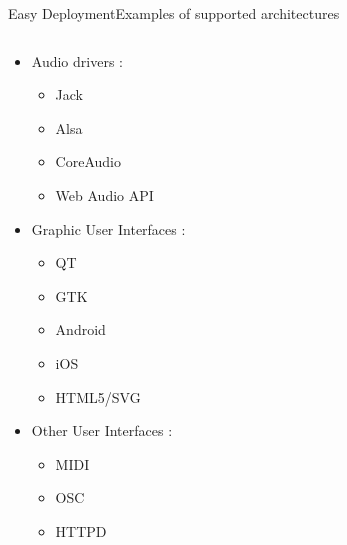 \begin{frame}[shrink=10]{Easy Deployment}{Examples of supported architectures}
\begin{columns}[t]
    \begin{column}{0.45\textwidth}
            \begin{itemize}
                \item Audio drivers :
                \begin{itemize}
                    \item Jack
                    \item Alsa
                    \item CoreAudio
                    \item Web Audio API
                \end{itemize}
                \item Graphic User Interfaces :
                \begin{itemize}
                    \item QT
                    \item GTK
                    \item Android
                    \item iOS
                    \item HTML5/SVG
                \end{itemize}
                \item Other User Interfaces :
                \begin{itemize}
                    \item MIDI
                    \item OSC
                    \item HTTPD
                \end{itemize}
            \end{itemize}
    \end{column}
    \end{columns}
\end{frame}
  
